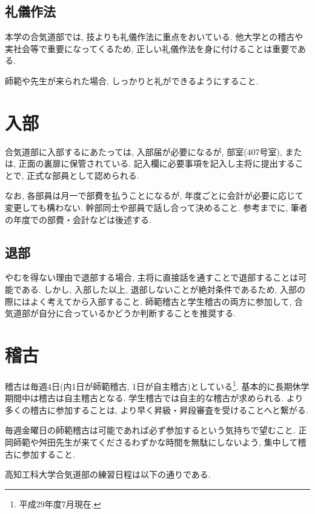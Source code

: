 \documentclass[a4j,titlepage]{jarticle}
\begin{document}
\subsection{礼儀作法}
本学の合気道部では, 技よりも礼儀作法に重点をおいている. 他大学との稽古や実社会等で重要になってくるため, 正しい礼儀作法を身に付けることは重要である. \par
師範や先生が来られた場合, しっかりと礼ができるようにすること.

\newpage

\section{入部}
合気道部に入部するにあたっては, 入部届が必要になるが, 部室(407号室), または, 正面の裏扉に保管されている. 記入欄に必要事項を記入し主将に提出することで, 正式な部員として認められる. \par
なお, 各部員は月一で部費を払うことになるが, 年度ごとに会計が必要に応じて変更しても構わない. 幹部同士や部員で話し合って決めること. 参考までに, 筆者の年度での部費・会計などは後述する.

\subsection{退部}
やむを得ない理由で退部する場合, 主将に直接話を通すことで退部することは可能である. しかし, 入部した以上, 退部しないことが絶対条件であるため, 入部の際にはよく考えてから入部すること. 師範稽古と学生稽古の両方に参加して, 合気道部が自分に合っているかどうか判断することを推奨する.

\section{稽古}
稽古は毎週4日(内1日が師範稽古, 1日が自主稽古)としている\footnote[1]{平成29年度7月現在.}. 基本的に長期休学期間中は稽古は自主稽古となる. 学生稽古では自主的な稽古が求められる. より多くの稽古に参加することは, より早く昇級・昇段審査を受けることへと繋がる. \par
毎週金曜日の師範稽古は可能であれば必ず参加するという気持ちで望むこと. 正岡師範や舛田先生が来てくださるわずかな時間を無駄にしないよう, 集中して稽古に参加すること. \par
高知工科大学合気道部の練習日程は以下の通りである.
\end{document}
